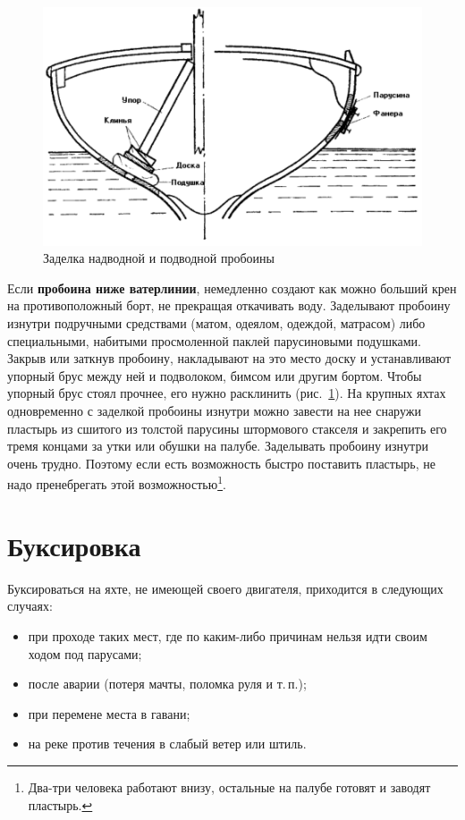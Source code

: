 \documentclass[a4paper, 12pt, twoside, final]{scrbook}
\begin{document}
\begin{figure}[htbp]
   \centering
   \includegraphics{136_Zadelka_proboin} %
   \caption{Заделка надводной и подводной пробоины}
   \label{fig:136}
\end{figure}

Если \textbf{пробоина ниже ватерлинии}, немедленно создают как можно больший крен на противоположный борт, не прекращая откачивать воду. Заделывают пробоину изнутри подручными средствами (матом, одеялом, одеждой, матрасом) либо специальными, набитыми просмоленной паклей парусиновыми подушками. Закрыв или заткнув пробоину, накладывают на это место доску и устанавливают упорный брус между ней и подволоком, бимсом или другим бортом. Чтобы упорный брус стоял прочнее, его нужно расклинить (рис.~\ref{fig:136}). На крупных яхтах одновременно с заделкой пробоины изнутри можно завести на нее снаружи пластырь из сшитого из толстой парусины штормового стакселя и закрепить его тремя концами за утки или обушки на палубе. Заделывать пробоину изнутри очень трудно. Поэтому если есть возможность быстро поставить пластырь, не надо пренебрегать этой возможностью\footnote{Два\--три человека работают внизу, остальные на палубе готовят и заводят пластырь.}.

\section{Буксировка}

Буксироваться на яхте, не имеющей своего двигателя, приходится в следующих случаях:

\begin{itemize}
\item при проходе таких мест, где по каким-либо причинам нельзя идти своим ходом под парусами;
\item после аварии (потеря мачты, поломка руля и т.\,п.);
\item при перемене места в гавани;
\item на реке против течения в слабый ветер или штиль.
\end{itemize}
\end{document}
